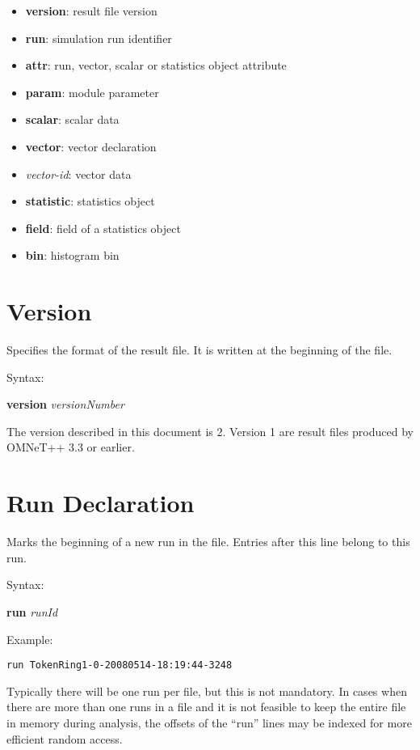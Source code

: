 \begin{itemize}
    \item \textbf{version}: result file version
    \item \textbf{run}: simulation run identifier
    \item \textbf{attr}: run, vector, scalar or statistics object attribute
    \item \textbf{param}: module parameter
    \item \textbf{scalar}: scalar data
    \item \textbf{vector}: vector declaration
    \item \textit{vector-id}: vector data
    \item \textbf{statistic}: statistics object
    \item \textbf{field}: field of a statistics object
    \item \textbf{bin}: histogram bin
\end{itemize}



\section{Version}

Specifies the format of the result file. It is written at the beginning of the file.

Syntax:

\hspace{20mm} \textbf{version} \textit{versionNumber}

The version described in this document is 2. Version 1 are result files produced
by OMNeT++ 3.3 or earlier.



\section{Run Declaration}

Marks the beginning of a new run in the file. Entries after this line
belong to this run.

Syntax:

\hspace{20mm} \textbf{run} \textit{runId}

Example:

\begin{verbatim}
run TokenRing1-0-20080514-18:19:44-3248
\end{verbatim}

Typically there will be one run per file, but this is not mandatory.
In cases when there are more than one runs in a file and it is not feasible
to keep the entire file in memory during analysis, the offsets of the ``run''
lines may be indexed for more efficient random access.

